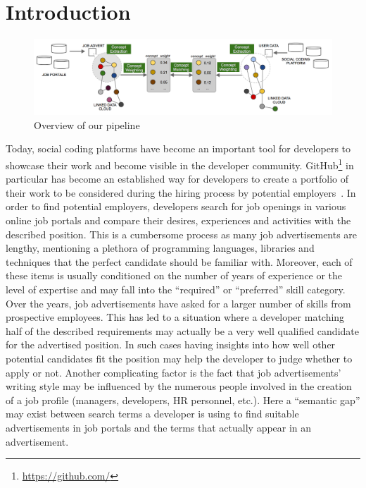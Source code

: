 \documentclass[conference]{IEEEtran}
\begin{document}
\section{Introduction}

\begin{figure}[!htb]
\centering
\includegraphics[scale=0.35]{../figs/pipeline.png}
\caption{Overview of our pipeline}
\label{fig:pipeline}
\end{figure}

Today, social coding platforms have become an important tool for developers to
showcase their work and become visible in the developer community.
GitHub\footnote{\url{https://github.com/}} in particular has become an
established way for developers to create a portfolio of their work to be
considered during the hiring process by potential
employers~\cite{dabbish2012social}. In order to find potential employers,
developers search for job openings in various online job portals and compare
their desires, experiences and activities with the described position. This is a
cumbersome process as many job advertisements are lengthy, mentioning a plethora
of programming languages, libraries and techniques that the perfect candidate
should be familiar with.  Moreover, each of these items is usually conditioned
on the number of years of experience or the level of expertise and may fall into
the ``required'' or ``preferred'' skill category. Over the years, job
advertisements have asked for a larger number of skills from prospective
employees. This has led to a situation where a developer matching half of the
described requirements may actually be a very well qualified candidate for the
advertised position. In such cases having insights into how well other potential
candidates fit the position may help the developer to judge whether to apply or
not. Another complicating factor is the fact that job advertisements' writing
style may be influenced by the numerous people involved in the creation of a job
profile (managers, developers, HR personnel, etc.). Here a ``semantic gap'' may
exist between search terms a developer is using to find suitable advertisements
in job portals and the terms that actually appear in an advertisement.
\end{document}
